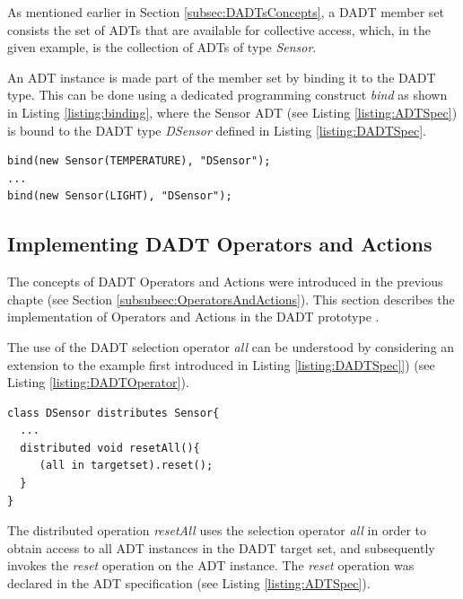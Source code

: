 As mentioned earlier in Section \ref{subsec:DADTsConcepts}, a DADT member set
 consists the set of ADTs that are available for collective
access, which, in the given example, is the collection of ADTs of type \emph{Sensor}.

An ADT instance is made part of the member set by binding it to the DADT type.
This can be done using a dedicated programming construct \emph{bind} as shown in
Listing \ref{listing:binding}, where the Sensor ADT (see Listing \ref{listing:ADTSpec}) is bound to the DADT type \emph{DSensor}
defined in Listing \ref{listing:DADTSpec}.
 
\begin{lstlisting}[frame=trbl, basewidth={0.55em, 0.6em}, captionpos=b, 
basicstyle=\ttfamily\footnotesize, breaklines, caption = Binding ADT instances to a DADT instance, label = listing:binding]
bind(new Sensor(TEMPERATURE), "DSensor");
...
bind(new Sensor(LIGHT), "DSensor");
\end{lstlisting} 


\subsection{Implementing DADT Operators and Actions}
\label{subsubsec:OperatorsAndActionsImpl}

The concepts of DADT Operators and Actions were introduced in the previous chapte (see Section \ref{subsubsec:OperatorsAndActions}). This section describes the implementation of Operators and Actions in the DADT prototype \cite{migliavaccaDADT:2006}.

The use of the DADT selection operator \emph{all} can be understood by considering an extension to the
 example first introduced in Listing \ref{listing:DADTSpec]}) (see Listing \ref{listing:DADTOperator}).

\begin{lstlisting}[frame=trbl, basewidth={0.55em, 0.6em}, captionpos=b, 
basicstyle=\ttfamily\footnotesize, breaklines, caption = Use of DADT Selection Operator, label = listing:DADTOperator]  
class DSensor distributes Sensor{
  ...
  distributed void resetAll(){
	 (all in targetset).reset();
  }
}
\end{lstlisting}

The distributed operation \emph{resetAll} uses the selection operator 
\emph{all} in order to obtain access to all ADT instances in the DADT
target set, and subsequently invokes the \emph{reset} operation on the ADT
instance. The \emph{reset} operation was declared in the ADT specification
(see Listing \ref{listing:ADTSpec}).

